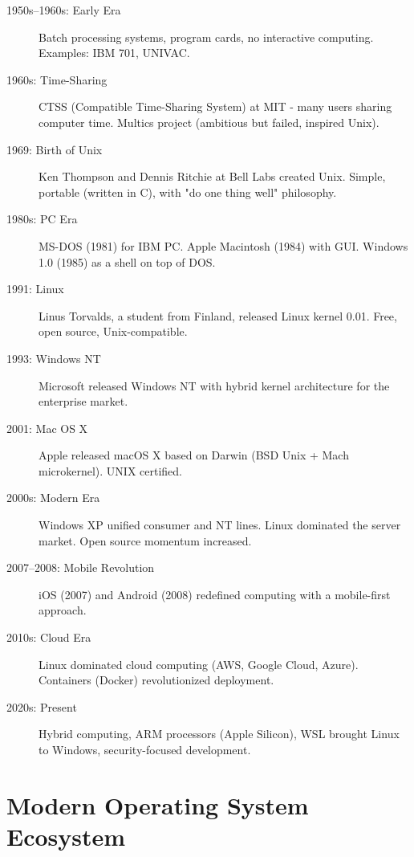 \begin{description}
    \item[1950s--1960s: Early Era] Batch processing systems, program cards, no interactive computing. Examples: IBM 701, UNIVAC.

    \item[1960s: Time-Sharing] CTSS (Compatible Time-Sharing System) at MIT - many users sharing computer time. Multics project (ambitious but failed, inspired Unix).

    \item[1969: Birth of Unix] Ken Thompson and Dennis Ritchie at Bell Labs created Unix. Simple, portable (written in C), with "do one thing well" philosophy.

    \item[1980s: PC Era] MS-DOS (1981) for IBM PC. Apple Macintosh (1984) with GUI. Windows 1.0 (1985) as a shell on top of DOS.

    \item[1991: Linux] Linus Torvalds, a student from Finland, released Linux kernel 0.01. Free, open source, Unix-compatible.

    \item[1993: Windows NT] Microsoft released Windows NT with hybrid kernel architecture for the enterprise market.

    \item[2001: Mac OS X] Apple released macOS X based on Darwin (BSD Unix + Mach microkernel). UNIX certified.

    \item[2000s: Modern Era] Windows XP unified consumer and NT lines. Linux dominated the server market. Open source momentum increased.

    \item[2007--2008: Mobile Revolution] iOS (2007) and Android (2008) redefined computing with a mobile-first approach.

    \item[2010s: Cloud Era] Linux dominated cloud computing (AWS, Google Cloud, Azure). Containers (Docker) revolutionized deployment.

    \item[2020s: Present] Hybrid computing, ARM processors (Apple Silicon), WSL brought Linux to Windows, security-focused development.
\end{description}

\section{Modern Operating System Ecosystem}
\label{sec:os-ecosystem}

